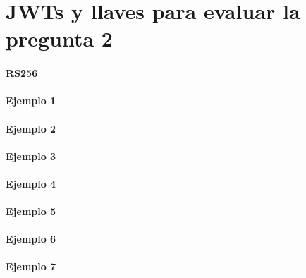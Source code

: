 
\section{JWTs y llaves para evaluar la pregunta 2}
\label{appendix:jwts-keys}

\paragraph{RS256}
\paragraph{Ejemplo 1}



\paragraph{Ejemplo 2}



\paragraph{Ejemplo 3}



\paragraph{Ejemplo 4}



\paragraph{Ejemplo 5}



\paragraph{Ejemplo 6}



\paragraph{Ejemplo 7}



